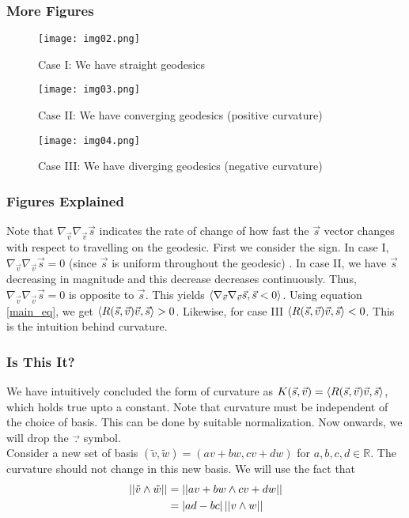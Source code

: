 \begin{frame}
\frametitle{More Figures}
\begin{figure}[!htb]
	\centering
   \begin{minipage}{0.3\textwidth}
     \centering
     \texttt{[image: img02.png]}
     \caption{{Case I: We have straight geodesics}}
     \label{fig:02}
   \end{minipage}
   \begin{minipage}{0.3\textwidth}
     \centering
     \texttt{[image: img03.png]}
     \caption{{Case II: We have converging geodesics (positive curvature)}}
     \label{fig:03}
   \end{minipage}
   \begin{minipage}{0.3\textwidth}
     \centering
     \texttt{[image: img04.png]}
     \caption{{Case III: We have diverging geodesics (negative curvature)}}
     \label{fig:04}
   \end{minipage}
\end{figure}
\end{frame}

\begin{frame}
\frametitle{Figures Explained}
Note that $\nabla_{\vec{v}}\nabla_{\vec{v}} \vec{s}$ indicates the rate of change of how fast the $\vec{s}$ vector changes with respect to travelling on the geodesic. First we consider the sign. In case I, $\nabla_{\vec{v}}\nabla_{\vec{v}} \vec{s}=0$ (since $\vec{s}$ is uniform throughout the geodesic) . In case II, we have $\vec{s}$ decreasing in magnitude and this decrease decreases continuously. Thus, $\nabla_{\vec{v}}\nabla_{\vec{v}} \vec{s}=0$ is opposite to $\vec{s}$. This yields $\left\langle \nabla_{\vec{v}}\nabla_{\vec{v}} \vec{s},\vec{s}<0 \right\rangle$. Using equation \ref{main_eq}, we get $\left\langle R(\vec{s},\vec{v}) \vec{v}, \vec{s} \right\rangle>0$. Likewise, for case III $\left\langle R(\vec{s},\vec{v}) \vec{v}, \vec{s} \right\rangle<0$. This is the intuition behind curvature.
\end{frame}

\begin{frame}
\frametitle{Is This It?}
We have intuitively concluded the form of curvature as $K(\vec{s},\vec{v})=\left\langle R(\vec{s},\vec{v}) \vec{v}, \vec{s} \right\rangle$, which holds true upto a constant. Note that curvature must be independent of the choice of basis. This can be done by suitable normalization.
\pause
Now onwards, we will drop the $\vec{.}$ symbol.\\
Consider a new set of basis $(\tilde{v},\tilde{w})=(av+bw,cv+dw)$ for $a,b,c,d\in\mathbb{R}$. The curvature should not change in this new basis. We will use the fact that 
\begin{align}
\left\lvert\left\lvert \tilde{v} \wedge \tilde{w} \right\rvert\right\rvert&=\left\lvert\left\lvert av+bw \wedge cv+dw \right\rvert\right\rvert\\
&=\left\lvert ad-bc \right\rvert\left\lvert\left\lvert v \wedge w \right\rvert\right\rvert
\end{align}
\end{frame}

